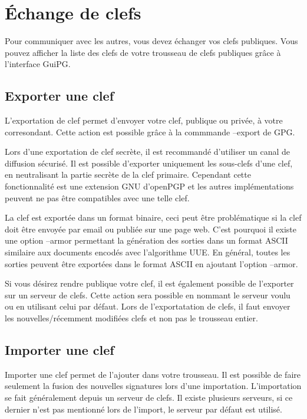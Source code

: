 \section{Échange de clefs}

Pour communiquer avec les autres, vous devez échanger vos clefs publiques. Vous pouvez afficher la liste des clefs de votre trousseau de clefs publiques grâce à l'interface
GuiPG.

\subsection{Exporter une clef}

L'exportation de clef permet d'envoyer votre clef, publique ou privée, à votre corresondant. Cette action est possible grâce à la commmande --export de GPG.

Lors d'une exportation de clef secrète, il est recommandé d'utiliser un canal de diffusion sécurisé. Il est possible d'exporter uniquement les sous-clefs d'une clef, en neutralisant la partie secrète de la clef primaire. Cependant cette fonctionnalité est une extension GNU d'openPGP et les autres implémentations peuvent ne pas être compatibles avec une telle clef.

La clef est exportée dans un format binaire, ceci peut être problématique si la clef doit être envoyée par email ou publiée sur une page web. C'est pourquoi il existe une option --armor permettant la génération des sorties dans un format ASCII similaire aux documents encodés avec l'algorithme UUE. En général, toutes les sorties peuvent être exportées dans le format ASCII en ajoutant l'option --armor.

Si vous désirez rendre publique votre clef, il est également possible de l'exporter sur un serveur de clefs. Cette action sera possible en nommant le serveur voulu ou en utilisant celui par défaut. Lors de l'exportatation de clefs, il faut envoyer les nouvelles/récemment modifiées clefs et non pas le trousseau entier.

\subsection{Importer une clef}

Importer une clef permet de l'ajouter dans votre trousseau. Il est possible de faire seulement la fusion des nouvelles signatures lors d'une importation.
L'importation se fait généralement depuis un serveur de clefs. Il existe plusieurs serveurs, si ce dernier n'est pas mentionné lors de l'import, le serveur par défaut est utilisé.


